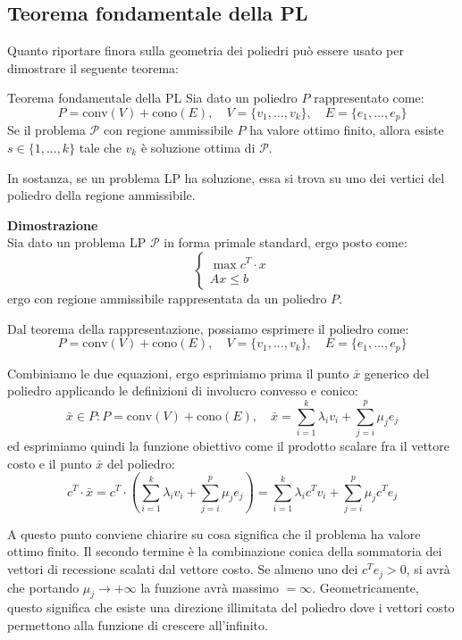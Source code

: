 \documentclass[a4paper,11pt]{article}
\begin{document}
\subsection{Teorema fondamentale della PL}
Quanto riportare finora sulla geometria dei poliedri può essere usato per dimostrare il seguente teorema:
\begin{theorem}{Teorema fondamentale della PL}
	Sia dato un poliedro $P$ rappresentato come:
	$$ 
	P = \mathrm{conv}(V) + \mathrm{cono}(E), \quad V = \{ v_1, ..., v_k \}, \quad E = \{ e_1, ..., e_p \}
	$$
	Se il problema $\mathcal{P}$ con regione ammissibile $P$ ha valore ottimo finito, allora esiste $s \in \{ 1, ..., k \}$ tale che $v_k$ è soluzione ottima di $\mathcal{P}$.
\end{theorem}

In sostanza, se un problema LP ha soluzione, essa si trova su uno dei vertici del poliedro della regione ammissibile.

\par\medskip
\noindent
\textbf{\textsf{Dimostrazione}} \\
Sia dato un problema LP $\mathcal{P}$ in forma primale standard, ergo posto come:
\[
	\begin{cases}
		\max{c^T \cdot x} \\ 
		Ax \leq b	
	\end{cases}
\]
ergo con regione ammissibile rappresentata da un poliedro $P$.

Dal teorema della rappresentazione, possiamo esprimere il poliedro come:
$$
	P = \mathrm{conv}(V) + \mathrm{cono}(E), \quad V = \{ v_1, ..., v_k \}, \quad E = \{ e_1, ..., e_p \}
$$

Combiniamo le due equazioni, ergo esprimiamo prima il punto $\bar{x}$ generico del poliedro applicando le definizioni di involucro convesso e conico:
$$
\bar{x} \in P : P = \mathrm{conv}(V) + \mathrm{cono}(E), \quad \bar{x} = \sum_{i=1}^k \lambda_i v_i + \sum_{j=i}^p \mu_j e_j
$$
ed esprimiamo quindi la funzione obiettivo come il prodotto scalare fra il vettore costo e il punto $\bar{x}$ del poliedro:
$$
c^T \cdot \bar{x} = c^T \cdot \left( \sum_{i=1}^k \lambda_i v_i + \sum_{j=i}^p \mu_j e_j \right) = \sum_{i=1}^k \lambda_i c^T v_i + \sum_{j=i}^p \mu_j c^T e_j
$$

A questo punto conviene chiarire su cosa significa che il problema ha valore ottimo finito.
Il secondo termine è la combinazione conica della sommatoria dei vettori di recessione scalati dal vettore costo.
Se almeno uno dei $c^T e_j > 0$, si avrà che portando $\mu_j \rightarrow +\infty$ la funzione avrà massimo $= \infty$.
Geometricamente, questo significa che esiste una direzione illimitata del poliedro dove i vettori costo permettono alla funzione di crescere all'infinito.
\end{document}
